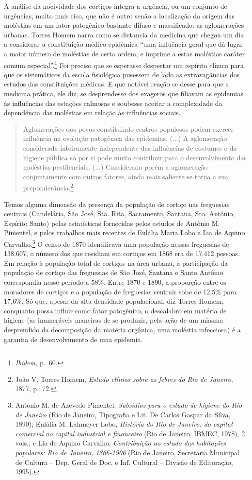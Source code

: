 A análise da nocividade dos cortiços integra a urgência, ou um conjunto
de urgências, muito mais rico, que não é outro senão a localização da
origem das moléstias em um fator patogênico bastante difuso e
massificado: as aglomerações urbanas. Torres Homem narra como se
distancia da medicina que chegou um dia a considerar a constituição
médico-epidêmica ``uma influência geral que dá lugar a maior número de
moléstias de certa ordem, e imprime a estas moléstias caráter comum
especial''.\footnote{\emph{Ibidem,} p.~60.} Foi preciso que se esperasse
despertar um espírito clínico para que os sistemáticos da escola
fisiológica pusessem de lado as extravagâncias dos estudos das
constituições médicas. E que notável reação se desse para que a medicina
prática, ele diz, se desprendesse dos exageros que filiavam as epidemias
às influências das estações calmosas e soubesse aceitar a complexidade
da dependência das moléstias em relação às influências sociais.

\begin{quote}
Aglomerações dos povos constituindo centros populosos podem exercer
influência na evolução patogênica das epidemias. (...) A aglomeração
considerada inteiramente independente das influências de costumes e da
higiene pública só por si pode muito contribuir para o desenvolvimento
das moléstias pestilenciais. (...) Considerada porém a aglomeração
conjuntamente com outros fatores, ainda mais saliente se torna a sua
preponderância.\footnote{João V. Torres Homem, \emph{Estudo clínico
  sobre as febres do Rio de Janeiro}, 1877, p.~72.}
\end{quote}

Temos alguma dimensão da presença da população de cortiço nas freguesias
centrais (Candelária, São José, Sta. Rita, Sacramento, Santana, Sto.
Antônio, Espírito Santo) pelas estatísticas fornecidas pelos estudos de
Antônio M. Pimentel, e pelos trabalhos mais recentes de Eulália Maria
Lobo e Lia de Aquino Carvalho.\footnote{Antonio M. de Azevedo Pimentel,
  \emph{Subsídios para o estudo de higiene do Rio de Janeiro} (Rio de
  Janeiro, Tipografia e Lit. De Carlos Gaspar da Silva, 1890); Eulália
  M. Lahmeyer Lobo, \emph{História do Rio de Janeiro: do capital
  comercial ao capital industrial e financeiro} (Rio de Janeiro, IBMEC,
  1978), 2 vols.; e Lia de Aquino Carvalho, \emph{Contribuição ao estudo
  das habitações populares: Rio de Janeiro, 1866-1906} (Rio de Janeiro,
  Secretaria Municipal de Cultura -- Dep. Geral de Doc. e Inf. Cultural
  -- Divisão de Editoração, 1995).} O censo de 1870 identificava uma
população nessas freguesias de 138.607, o número dos que residiam em
cortiços em 1868 era de 17.412 pessoas. Em relação à população total de
cortiços na área urbana, a participação da população de cortiço das
freguesias de São José, Santana e Santo Antônio correspondia nesse
período a 58\%. Entre 1870 e 1890, a proporção entre os moradores de
cortiços e a população de freguesias centrais sobe de 12,5\% para
17,6\%. Só que, apesar da alta densidade populacional, diz Torres Homem,
conquanto possa influir como fator patogênico, o descalabro em matéria
de higiene (as inumeráveis maneiras de se produzir, pela ação de um
miasma desprendido da decomposição da matéria orgânica, uma moléstia
infecciosa) é a garantia de desenvolvimento de uma epidemia.

